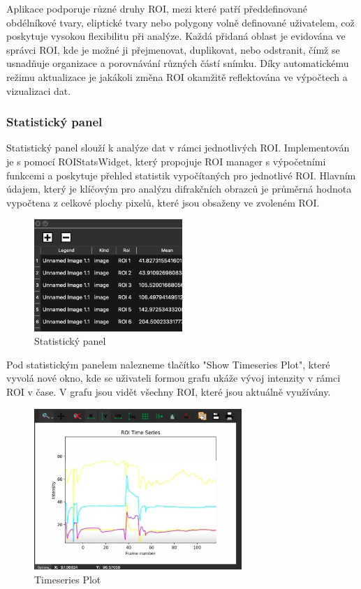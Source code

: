 \documentclass[a4paper,11pt]{article}
\begin{document}
Aplikace podporuje různé druhy ROI, mezi které patří předdefinované obdélníkové tvary, eliptické tvary nebo polygony volně definované uživatelem, což poskytuje vysokou flexibilitu při analýze. Každá přidaná oblast je evidována ve správci ROI, kde je možné ji přejmenovat, duplikovat, nebo odstranit, čímž se usnadňuje organizace a porovnávání různých částí snímku. Díky automatickému režimu aktualizace je jakákoli změna ROI okamžitě reflektována ve výpočtech a vizualizaci dat.

\newpage

\subsubsection{Statistický panel}
Statistický panel slouží k analýze dat v rámci jednotlivých ROI. Implementován je s pomocí ROIStatsWidget, který propojuje ROI manager s výpočetními funkcemi a poskytuje přehled statistik vypočítaných pro jednotlivé ROI. Hlavním údajem, který je klíčovým pro analýzu difrakčních obrazců je průměrná hodnota vypočtena z celkové plochy pixelů, které jsou obsaženy ve zvoleném ROI.
\begin{figure}[H]
    \centering
    \includegraphics[width=0.5\textwidth]{images/StatistickyPanel.jpg}
    \caption{Statistický panel}
\end{figure}
Pod statistickým panelem nalezneme tlačítko "Show Timeseries Plot", které vyvolá nové okno, kde se uživateli formou grafu ukáže vývoj intenzity v rámci ROI v čase. V grafu jsou vidět všechny ROI, které jsou aktuálně využívány.

\begin{figure}[H]
    \centering
    \includegraphics[width=0.7\textwidth]{images/TimeseriesPlot.png}
    \caption{Timeseries Plot}
\end{figure}
\end{document}
